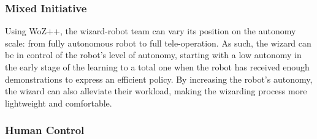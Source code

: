 \documentclass[manuscript, review, anonymous]{acmart}
\newcommand{\ES}[1]{\added[id=ES]{#1}}
\newcommand{\woz}{WoZ++\xspace}
\begin{document}


\subsubsection{Mixed Initiative}

Using \woz, the wizard-robot team can vary its position on the autonomy
scale: from fully autonomous robot to full tele-operation.
As such, the wizard can be in control of the robot's level of autonomy, starting
with a low autonomy in the early stage of the learning to a total one when the
robot has received enough demonstrations to express an efficient policy. By
increasing the robot's autonomy, the wizard can also alleviate their workload,
making the wizarding process more lightweight and comfortable.


\subsubsection{Human Control}
\end{document}
